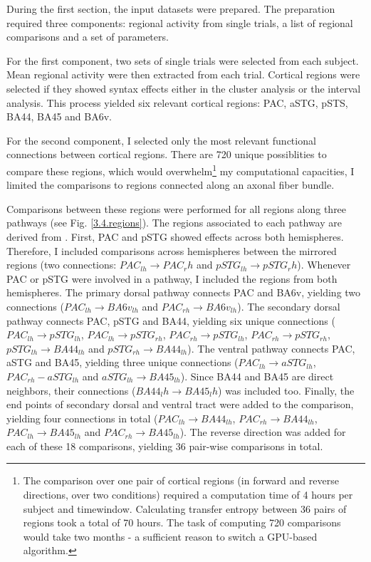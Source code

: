 During the first section, the input datasets were prepared.
The preparation required three components: regional activity from single trials, a list of regional comparisons and a set of parameters.

For the first component, two sets of single trials were selected from each subject.
Mean regional activity were then extracted from each trial.
Cortical regions were selected if they showed syntax effects either in the cluster analysis or the interval analysis.
This process yielded six relevant cortical regions: PAC, aSTG, pSTS, BA44, BA45 and BA6v.

For the second component, I selected only the most relevant functional connections between cortical regions.
There are 720 unique possiblities to compare these regions, which would overwhelm\footnote{The comparison over one pair of cortical regions (in forward and reverse directions, over two conditions) required a computation time of 4 hours per subject and timewindow. Calculating transfer entropy between 36 pairs of regions took a total of 70 hours. The task of computing 720 comparisons would take two months - a sufficient reason to switch a GPU-based algorithm\cite{3.4.gpuTE}.} my computational capacities, I limited the comparisons to regions connected along an axonal fiber bundle.

Comparisons between these regions were performed for all regions along three pathways (see Fig. \ref{3.4.regions}).
The regions associated to each pathway are derived from \cite{3.4.pathways}.
First, PAC and pSTG showed effects across both hemispheres.
Therefore, I included comparisons across hemispheres between the mirrored regions (two connections: $PAC_{lh} \rightarrow PAC_rh$ and $pSTG_{lh} \rightarrow pSTG_rh$).
Whenever PAC or pSTG were involved in a pathway, I included the regions from both hemispheres.
The primary dorsal pathway connects PAC and BA6v, yielding two connections ($PAC_{lh} \rightarrow BA6v_{lh}$ and $PAC_{rh} \rightarrow BA6v_{lh}$).
The secondary dorsal pathway connects PAC, pSTG and BA44, yielding six unique connections ($PAC_{lh} \rightarrow pSTG_{lh}$, $PAC_{lh} \rightarrow pSTG_{rh}$, $PAC_{rh} \rightarrow pSTG_{lh}$, $PAC_{rh} \rightarrow pSTG_{rh}$, $pSTG_{lh} \rightarrow BA44_{lh}$ and $pSTG_{rh} \rightarrow BA44_{lh}$).
The ventral pathway connects PAC, aSTG and BA45, yielding three unique connections ($PAC_{lh} \rightarrow aSTG_{lh}$, $PAC_{rh}-aSTG_{lh}$ and $aSTG_{lh} \rightarrow BA45_{lh}$).
Since BA44 and BA45 are direct neighbors, their connections ($BA44_lh \rightarrow BA45_lh$) was included too.
Finally, the end points of secondary dorsal and ventral tract were added to the comparison, yielding four connections in total ($PAC_{lh} \rightarrow BA44_{lh}$, $PAC_{rh} \rightarrow BA44_{lh}$, $PAC_{lh} \rightarrow BA45_{lh}$ and $PAC_{rh} \rightarrow BA45_{lh}$).
The reverse direction was added for each of these 18 comparisons, yielding 36 pair-wise comparisons in total.

